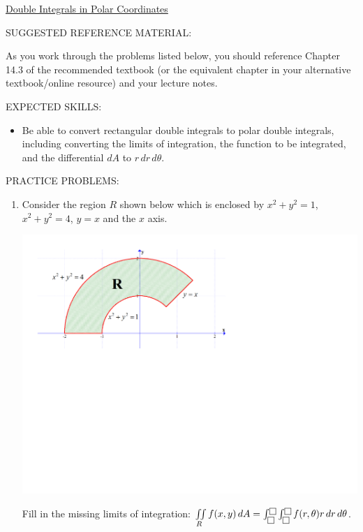 \documentclass[12pt]{article}
\newif\ifans
\begin{document}
\begin{center}
\underline{\LARGE{Double Integrals in Polar Coordinates}}
\end{center}

\noindent SUGGESTED REFERENCE MATERIAL:

\bigskip

\noindent As you work through the problems listed below, you should reference Chapter 14.3 of the recommended textbook (or the equivalent chapter in your alternative textbook/online resource) and your lecture notes.

\bigskip

\noindent EXPECTED SKILLS:

\begin{itemize}

\item Be able to convert rectangular double integrals to polar double integrals, including converting the limits of integration, the function to be integrated, and the differential $dA$ to $r\,dr\,d\theta$.

\end{itemize}

\noindent PRACTICE PROBLEMS:

\medskip

\begin{enumerate}

\item Consider the region $R$ shown below which is enclosed by $x^2+y^2=1$, $x^2+y^2=4$, $y=x$ and the $x$ axis.

\begin{center}
\includegraphics[scale=0.5]{region1.pdf}
\end{center}

Fill in the missing limits of integration: $\iint \limits_{R} f(x,y) \,dA = \int_{\fbox{}}^{\fbox{}}\int_{\fbox{}}^{\fbox{}} f(r,\theta) r \,dr \,d\theta$.

\ifans{\fbox{$\iint \limits_{R} f(x,y) \,dA = \int_{\pi/4}^{\pi}\int_{1}^{2} f(r,\theta) r \,dr \,d\theta$}} \fi

\end{enumerate}
\end{document}
